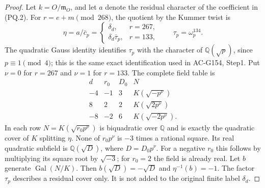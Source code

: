 \begin{proof}
Let $k=O/\mathfrak m_O$, and let $a$ denote the residual character
of the coefficient in (PQ.2).
For $r=e+m\pmod{268}$, the quotient by the Kummer twist is
\[
 \eta=a/\bar c_p=
 \begin{cases}
   \delta_d,&r=267,\\
   \delta_d\bar\tau_p,&r=133,
 \end{cases}
 \qquad \tau_p=\omega_p^{134}.
 \tag{PQ.3}
\]
The quadratic Gauss identity identifies $\tau_p$ with the
character of $\mathbb Q(\sqrt p)$, since $p\equiv1\pmod4$;
this is the same exact identification used in AC-G154, Step1.
Put $\nu=0$ for $r=267$ and $\nu=1$ for $r=133$.
The complete field table is
\[
 \begin{array}{c|r|r|r}
 d&r_0&D_0&N\\ \hline
 -4&-1&3&K(\sqrt{-p^\nu})\\
  8& 2&2&K(\sqrt{2p^\nu})\\
 -8&-2&6&K(\sqrt{-2p^\nu}).
 \end{array}
 \tag{PQ.4}
\]
In each row $N=K(\sqrt{r_0p^\nu})$ is biquadratic over
$\mathbb Q$ and is exactly the quadratic cover of $K$ splitting
$\eta$.  None of $r_0p^\nu$ is $-3$ times a rational square.
Its real quadratic subfield is $\mathbb Q(\sqrt D)$, where
$D=D_0p^\nu$.
For a negative $r_0$ this follows by multiplying its square root
by $\sqrt{-3}$; for $r_0=2$ the field is already real.
Let $b$ generate $\operatorname{Gal}(N/K)$.
Then $b(\sqrt D)=-\sqrt D$ and $\eta^{-1}(b)=-1$.
The factor $\tau_p$ describes a residual cover only.
It is not added to the original finite label $\delta_d$.


\end{proof}
